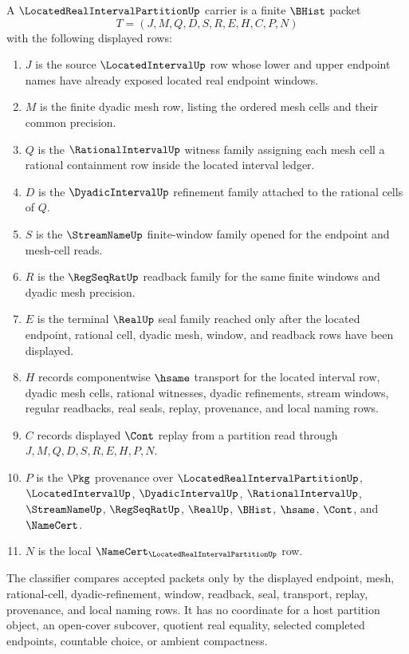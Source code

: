 \begin{definition}
\label{def:located-real-interval-partition-carrier}
A $\LocatedRealIntervalPartitionUp$ carrier is a finite $\BHist$ packet
$$
T=(J,M,Q,D,S,R,E,H,C,P,N)
$$
with the following displayed rows:
\begin{enumerate}
\item $J$ is the source $\LocatedIntervalUp$ row whose lower and upper endpoint names have already exposed located real endpoint windows.
\item $M$ is the finite dyadic mesh row, listing the ordered mesh cells and their common precision.
\item $Q$ is the $\RationalIntervalUp$ witness family assigning each mesh cell a rational containment row inside the located interval ledger.
\item $D$ is the $\DyadicIntervalUp$ refinement family attached to the rational cells of $Q$.
\item $S$ is the $\StreamNameUp$ finite-window family opened for the endpoint and mesh-cell reads.
\item $R$ is the $\RegSeqRatUp$ readback family for the same finite windows and dyadic mesh precision.
\item $E$ is the terminal $\RealUp$ seal family reached only after the located endpoint, rational cell, dyadic mesh, window, and readback rows have been displayed.
\item $H$ records componentwise $\hsame$ transport for the located interval row, dyadic mesh cells, rational witnesses, dyadic refinements, stream windows, regular readbacks, real seals, replay, provenance, and local naming rows.
\item $C$ records displayed $\Cont$ replay from a partition read through $J,M,Q,D,S,R,E,H,P,N$.
\item $P$ is the $\Pkg$ provenance over $\LocatedRealIntervalPartitionUp$, $\LocatedIntervalUp$, $\DyadicIntervalUp$, $\RationalIntervalUp$, $\StreamNameUp$, $\RegSeqRatUp$, $\RealUp$, $\BHist$, $\hsame$, $\Cont$, and $\NameCert$.
\item $N$ is the local $\NameCert_{\LocatedRealIntervalPartitionUp}$ row.
\end{enumerate}
The classifier compares accepted packets only by the displayed endpoint, mesh, rational-cell, dyadic-refinement, window, readback, seal, transport, replay, provenance, and local naming rows. It has no coordinate for a host partition object, an open-cover subcover, quotient real equality, selected completed endpoints, countable choice, or ambient compactness.
\end{definition}

